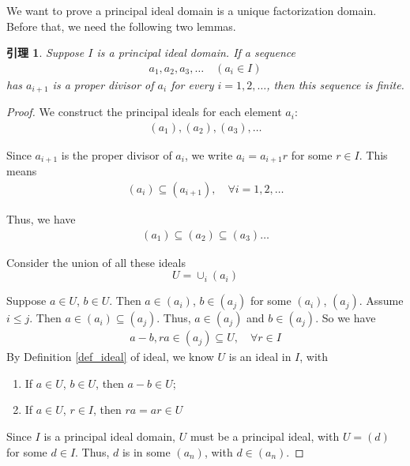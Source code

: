 \documentclass[utf8]{ctexbook}
\newtheorem{lemma}{引理}[section]
\begin{document}
We want to prove a principal ideal domain is a unique factorization domain. Before that, we need the following two lemmas.

\begin{lemma}\label{lemma_principal_ideal_domain_UFD_1}
Suppose $I$ is a principal ideal domain. If a sequence
\begin{align*}
a_1, a_2, a_3, \ldots \quad (a_i \in I)
\end{align*}
has $a_{i+1}$ is a proper divisor of $a_{i}$ for every $i = 1, 2, \ldots$, then this sequence is finite.
\end{lemma}

\begin{proof}
We construct the principal ideals for each element $a_i$:
\begin{align*}
(a_1), (a_2), (a_3), \ldots
\end{align*}

Since $a_{i+1}$ is the proper divisor of $a_i$, we write $a_i = a_{i+1} r $ for some $r \in I$. This means
\begin{align*}
(a_{i}) \subseteq (a_{i+1}), \quad \forall i = 1, 2, \ldots
\end{align*}

Thus, we have
\begin{align*}
(a_1) \subseteq (a_2) \subseteq (a_3) \ldots
\end{align*}

Consider the union of all these ideals
\begin{equation}
U = \cup_{i} (a_i)
\end{equation}

Suppose $a \in U$, $b \in U$. Then $a \in (a_i)$, $b \in (a_j)$ for some $(a_i)$, $(a_j)$. Assume $i \leq j$. Then $a \in (a_i) \subseteq (a_j)$. Thus, $a \in (a_j)$ and $b \in (a_j)$. So we have
\begin{align*}
a-b, ra \in (a_j) \subseteq U, \quad \forall r \in I
\end{align*}
By Definition \ref{def_ideal} of ideal, we know $U$ is an ideal in $I$, with
\begin{enumerate}
\item{If $a\in U$, $b \in U$, then $a-b \in U$;}
\item{If $a \in U$, $r \in I$, then $ra = a r \in U$}
\end{enumerate}

Since $I$ is a principal ideal domain, $U$ must be a principal ideal, with $U = (d)$ for some $d \in I$. Thus, $d$ is in some $(a_n)$, with $d \in (a_n)$. 


\end{proof}
\end{document}
